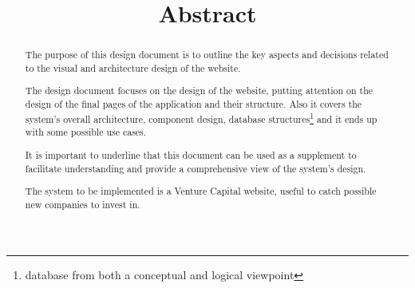 \documentclass[../DD.tex]{subfiles}
\begin{document}
\title{Abstract}
\begin{abstract}

The purpose of this design document is to outline the key aspects and decisions related to the visual and architecture design of the website.

The design document focuses on the design of the website, putting attention on the design of the final pages of the application and their structure. Also it covers the system's overall architecture, component design, database structures\footnote{database from both a conceptual and logical viewpoint} and it ends up with some possible use cases. 

It is important to underline that this document can be used as a supplement to facilitate understanding and provide a comprehensive view of the system's design.
	
The system to be implemented is a Venture Capital website, useful to catch possible new companies to invest in. 

\end{abstract}

\thispagestyle{fancy}
	\newpage
		
\end{document}
